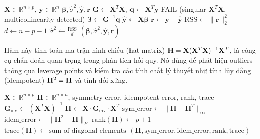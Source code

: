 \begin{algorithm}[H]
\caption{Ordinary Least Squares (OLS) via Normal Equations}
\begin{algorithmic}[1]
\Require $\mathbf{X} \in \mathbb{R}^{n \times p}$, $\mathbf{y} \in \mathbb{R}^n$
\Ensure $\boldsymbol{\beta}, \hat{\sigma}^2, \hat{\mathbf{y}}, \mathbf{r}$
\State $\mathbf{G} \gets \mathbf{X}^T\mathbf{X}$, $\mathbf{q} \gets \mathbf{X}^T\mathbf{y}$ 
    \State \Return \textsc{FAIL} (singular $\mathbf{X}^T\mathbf{X}$, multicollinearity detected)
\EndIf
\State $\boldsymbol{\beta} \gets \mathbf{G}^{-1}\mathbf{q}$ 
\State $\hat{\mathbf{y}} \gets \mathbf{X}\boldsymbol{\beta}$ 
\State $\mathbf{r} \gets \mathbf{y} - \hat{\mathbf{y}}$ 
\State $\text{RSS} \gets \|\mathbf{r}\|_2^2$ 
\State $d \gets n - p - 1$ 
\State $\hat{\sigma}^2 \gets \frac{\text{RSS}}{d}$ 
\State \Return $(\boldsymbol{\beta}, \hat{\sigma}^2, \hat{\mathbf{y}}, \mathbf{r})$

\end{algorithmic}
\end{algorithm}


Hàm này tính toán ma trận hình chiếu (hat matrix) $\mathbf{H} = \mathbf{X}(\mathbf{X}^T\mathbf{X})^{-1}\mathbf{X}^T$, là công cụ chẩn đoán quan trọng trong phân tích hồi quy. Nó dùng để phát hiện outliers thông qua leverage points và kiểm tra các tính chất lý thuyết như tính lũy đẳng (idempotent) $\mathbf{H}^2 = \mathbf{H}$ và tính đối xứng.

\begin{algorithm}[H]
\caption{Hat Matrix Computation and Property Verification}
\begin{algorithmic}[1]
\Require $\mathbf{X} \in \mathbb{R}^{n \times p}$
\Ensure $\mathbf{H} \in \mathbb{R}^{n \times n}$, symmetry error, idempotent error, rank, trace
\State $\mathbf{G}_{\text{inv}} \gets (\mathbf{X}^T\mathbf{X})^{-1}$
\State $\mathbf{H} \gets \mathbf{X} \cdot \mathbf{G}_{\text{inv}} \cdot \mathbf{X}^T$
\State $\text{sym\_error} \gets \|\mathbf{H} - \mathbf{H}^T\|_\infty$ 
\State $\text{idem\_error} \gets \|\mathbf{H}^2 - \mathbf{H}\|_F$ 
\State $\text{rank}(\mathbf{H}) \gets p+1$ 
\State $\text{trace}(\mathbf{H}) \gets \text{sum of diagonal elements}$ 
\State \Return $(\mathbf{H}, \text{sym\_error}, \text{idem\_error}, \text{rank}, \text{trace})$
\end{algorithmic}
\end{algorithm}

